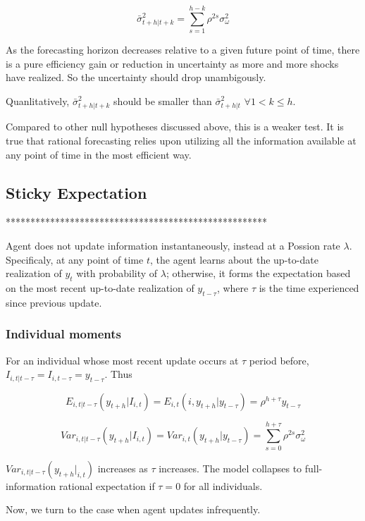 \documentclass[]{article}
\begin{document}
$$\bar \sigma^2_{t+h|t+k} = \sum^{h-k}_{s=1}\rho^{2s} \sigma^2_{\omega}$$

As the forecasting horizon decreases relative to a given future point of time, there is a pure efficiency gain or reduction in uncertainty as more and more shocks have realized. So the uncertainty should drop unambigously. 

Quanlitatively, $\bar \sigma^2_{t+h|t+k}$ should be smaller than $\bar \sigma^2_{t+h|t}$ $\forall 1<k\leq h$. 

Compared to other null hypotheses discussed above, this is a weaker test. It is true that rational forecasting relies upon utilizing all the information available at any point of time in the most efficient way. 


\subsection{Sticky Expectation}

*****************************************************

Agent does not update information instantaneously, instead at a Possion rate $\lambda$. Specificaly, at any point of time $t$, the agent learns about the up-to-date realization of $y_t$ with probability of $\lambda$; otherwise, it forms the expectation based on the most recent up-to-date realization of $y_{t-\tau}$, where $\tau$ is the time experienced since previous update. 

\subsubsection{Individual moments} 

For an individual whose most recent update occurs at $\tau$ period before, $I_{i,t|t-\tau} = I_{i,t-\tau} = y_{t-\tau}$. Thus

$$E_{i,t|t-\tau}(y_{t+h}|I_{i,t}) = E_{i,t}(i,y_{t+h}|y_{t-\tau}) = \rho^{h+\tau} y_{t-\tau}$$

$$Var_{i,t|t-\tau}(y_{t+h}|I_{i,t}) = Var_{i,t}(y_{t+h}|y_{t-\tau}) = \sum^{h+\tau}_{s=0}\rho^{2s} \sigma^2_{\omega}$$

$Var_{i,t|t-\tau}(y_{t+h}|_{i,t})$ increases as $\tau$ increases. The model collapses to full-information rational expectation if $\tau=0$ for all individuals. 

Now, we turn to the case when agent updates infrequently. 
\end{document}

